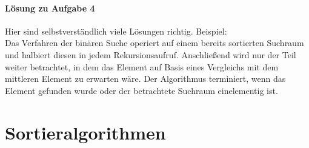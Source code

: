 \documentclass[11pt,a4paper]{scrartcl}
\begin{document}
\paragraph{Lösung zu Aufgabe 4}
\label{a2.4:lsg}
Hier sind selbstverständlich viele Lösungen richtig. Beispiel: \\
Das Verfahren der binären Suche operiert auf einem bereits sortierten Suchraum und halbiert diesen in jedem Rekursionsaufruf. Anschließend wird nur der Teil weiter betrachtet, in dem das Element auf Basis eines Vergleichs mit dem mittleren Element zu erwarten wäre. Der Algorithmus terminiert, wenn das Element gefunden wurde oder der betrachtete Suchraum einelementig ist.
\section{Sortieralgorithmen}
\end{document}
